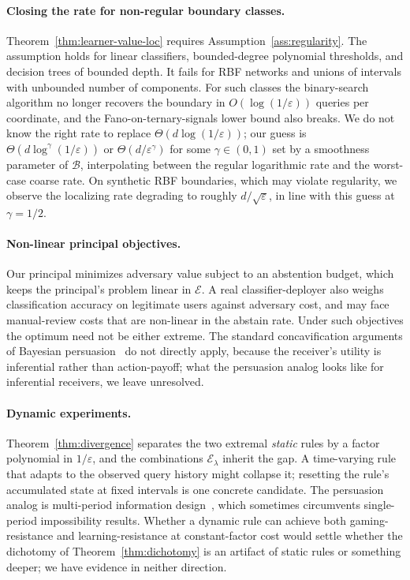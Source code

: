 \documentclass[runningheads,envcountsame]{llncs}
\newcommand{\cB}{\mathcal{B}}
\newcommand{\cE}{\mathcal{E}}
\newcommand{\eps}{\varepsilon}
\begin{document}
\paragraph{Closing the rate for non-regular boundary classes.} Theorem~\ref{thm:learner-value-loc} requires Assumption~\ref{ass:regularity}. The assumption holds for linear classifiers, bounded-degree polynomial thresholds, and decision trees of bounded depth. It fails for RBF networks and unions of intervals with unbounded number of components. For such classes the binary-search algorithm no longer recovers the boundary in $O(\log(1/\eps))$ queries per coordinate, and the Fano-on-ternary-signals lower bound also breaks. We do not know the right rate to replace $\Theta(d \log(1/\eps))$; our guess is $\Theta(d \log^\gamma(1/\eps))$ or $\Theta(d/\eps^\gamma)$ for some $\gamma \in (0, 1)$ set by a smoothness parameter of $\cB$, interpolating between the regular logarithmic rate and the worst-case coarse rate. On synthetic RBF boundaries, which may violate regularity, we observe the localizing rate degrading to roughly $d/\sqrt{\eps}$, in line with this guess at $\gamma = 1/2$.

\paragraph{Non-linear principal objectives.} Our principal minimizes adversary value subject to an abstention budget, which keeps the principal's problem linear in $\cE$. A real classifier-deployer also weighs classification accuracy on legitimate users against adversary cost, and may face manual-review costs that are non-linear in the abstain rate. Under such objectives the optimum need not be either extreme. The standard concavification arguments of Bayesian persuasion~\cite{kamenica2011bayesian} do not directly apply, because the receiver's utility is inferential rather than action-payoff; what the persuasion analog looks like for inferential receivers, we leave unresolved.

\paragraph{Dynamic experiments.} Theorem~\ref{thm:divergence} separates the two extremal \emph{static} rules by a factor polynomial in $1/\eps$, and the combinations $\cE_\lambda$ inherit the gap. A time-varying rule that adapts to the observed query history might collapse it; resetting the rule's accumulated state at fixed intervals is one concrete candidate. The persuasion analog is multi-period information design~\cite{ely2017beeps}, which sometimes circumvents single-period impossibility results. Whether a dynamic rule can achieve both gaming-resistance and learning-resistance at constant-factor cost would settle whether the dichotomy of Theorem~\ref{thm:dichotomy} is an artifact of static rules or something deeper; we have evidence in neither direction.
\end{document}
